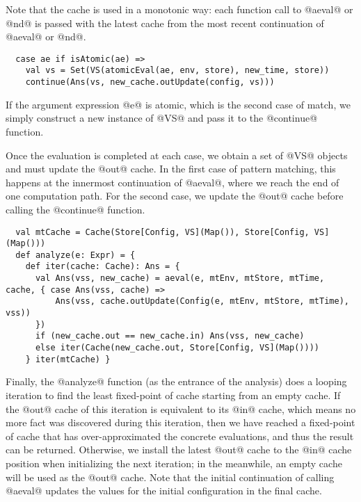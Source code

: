 \documentclass[acmsmall, review]{acmart}\settopmatter{}
\begin{document}
Note that the cache is used in a monotonic way: each function call to @aeval@ or @nd@ 
is passed with the latest cache from the most recent continuation of @aeval@ or @nd@.

\begin{lstlisting}
  case ae if isAtomic(ae) =>
    val vs = Set(VS(atomicEval(ae, env, store), new_time, store))
    continue(Ans(vs, new_cache.outUpdate(config, vs)))
\end{lstlisting}

If the argument expression @e@ is atomic, which is the second case of match, we simply 
construct a new instance of @VS@ and pass it to the @continue@ function.

Once the evaluation is completed at each case, we obtain a set of @VS@ objects and must update the @out@ cache.
In the first case of pattern matching, this happens at the innermost continuation of @aeval@,
where we reach the end of one computation path.
For the second case, we update the @out@ cache before calling the @continue@ function.

\begin{lstlisting}
  val mtCache = Cache(Store[Config, VS](Map()), Store[Config, VS](Map()))
  def analyze(e: Expr) = {
    def iter(cache: Cache): Ans = {
      val Ans(vss, new_cache) = aeval(e, mtEnv, mtStore, mtTime, cache, { case Ans(vss, cache) => 
          Ans(vss, cache.outUpdate(Config(e, mtEnv, mtStore, mtTime), vss))
      })
      if (new_cache.out == new_cache.in) Ans(vss, new_cache)
      else iter(Cache(new_cache.out, Store[Config, VS](Map())))
    } iter(mtCache) }
\end{lstlisting}

Finally, the @analyze@ function (as the entrance of the analysis) does a looping iteration
to find the least fixed-point of cache starting from an empty cache.
If the @out@ cache of this iteration is equivalent to its @in@ cache, which means no more 
fact was discovered during this iteration, then we have reached a fixed-point of cache that 
has over-approximated the concrete evaluations, and thus the result can be returned.
Otherwise, we install the latest @out@ cache to the @in@ cache position when initializing 
the next iteration; in the meanwhile, an empty cache will be used as the @out@ cache. 
Note that the initial continuation of calling @aeval@ updates the values for the initial 
configuration in the final cache.

\end{document}
